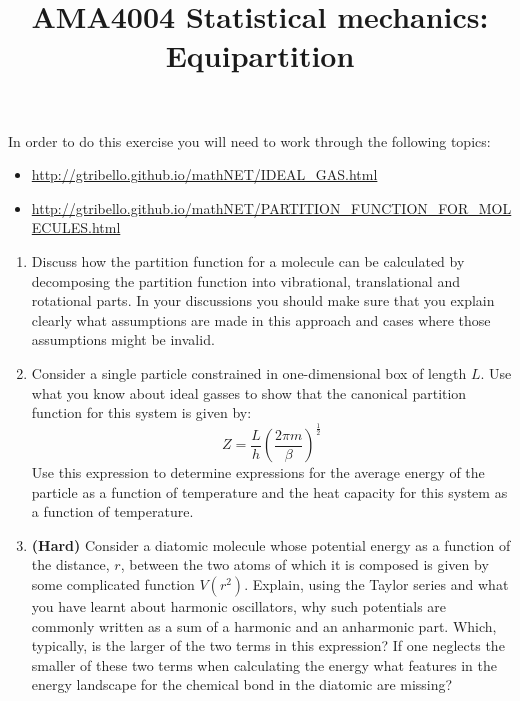 \documentclass[a4paper]{article}
\title{
\vspace{-3em}
\begin{tcolorbox}
\Huge\sffamily AMA4004 Statistical mechanics: Equipartition  
\end{tcolorbox}
\vspace{-3em}
}
\date{}
\begin{document}
\maketitle

In order to do this exercise you will need to work through the following topics:

\begin{itemize}
\item \href{http://gtribello.github.io/mathNET/IDEAL\_GAS.html}{http://gtribello.github.io/mathNET/IDEAL\_GAS.html}
\item \href{http://gtribello.github.io/mathNET/PARTITION\_FUNCTION\_FOR\_MOLECULES.html}{http://gtribello.github.io/mathNET/PARTITION\_FUNCTION\_FOR\_MOLECULES.html}
\end{itemize}

\begin{enumerate}

\item Discuss how the partition function for a molecule can be calculated by decomposing the partition function into vibrational, translational and rotational parts.  In your discussions you should make sure that you explain clearly what assumptions are made in this approach and cases where those assumptions might be invalid.

\item Consider a single particle constrained in one-dimensional box of length $L$.  Use what you know about ideal gasses to show that the canonical partition function for this system is given by:
$$
Z = \frac{L}{h} \left( \frac{2\pi m}{\beta} \right)^\frac{1}{2} 
$$
Use this expression to determine expressions for the average energy of the particle as a function of temperature and the heat capacity for this system as a function of temperature.

\item {\bf (Hard)} Consider a diatomic molecule whose potential energy as a function of the distance, $r$, between the two atoms of which it is composed is given by some complicated function $V(r^2)$.  Explain, using the Taylor series and what you have learnt about harmonic oscillators, why such potentials are commonly written as a sum of a harmonic and an anharmonic part.  Which, typically, is the larger of the two terms in this expression?  If one neglects the smaller of these two terms when calculating the energy what features in the energy landscape for the chemical bond in the diatomic are missing?


\end{enumerate}
\end{document}
